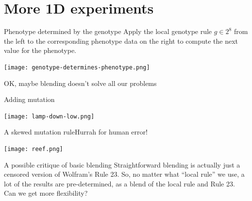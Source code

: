 \part{More 1D experiments}
\frame{\partpage}

\begin{frame}{Phenotype determined by the genotype}{}
Apply the local genotype rule $g\in 2^8$ from the left to the corresponding phenotype data  on the right to compute the next value for the phenotype.
\begin{center}
\texttt{[image: genotype-determines-phenotype.png]}
\pause

OK, maybe blending doesn't solve all our problems
\end{center}
\end{frame}

\begin{frame}{Adding mutation}{}
\begin{center}
\texttt{[image: lamp-down-low.png]}
\end{center}
\end{frame}

\begin{frame}{A skewed mutation rule}{Hurrah for human error!}
\begin{center}
\texttt{[image: reef.png]}
\end{center}
\end{frame}

\begin{frame}[fragile]{A possible critique of basic blending}{}
Straightforward blending is actually just a censored version of Wolfram's Rule 23.  So, no matter what ``local rule'' we use, a lot of the results are pre-determined, as a blend of the local rule and Rule 23.  Can we get more flexibility?
\begin{columns}
\begin{column}[T]{.2in}
\end{column}
%

\begin{column}[T]{1.6in}
\begin{fminipage}{1.6in}

\end{fminipage}
\end{column}

% 
\begin{column}[T]{2in}
\begin{fminipage}{1.6in}

\end{fminipage}
\end{column}

%
\begin{column}[T]{.05in}
\end{column}
%
\end{columns}

\end{frame}

